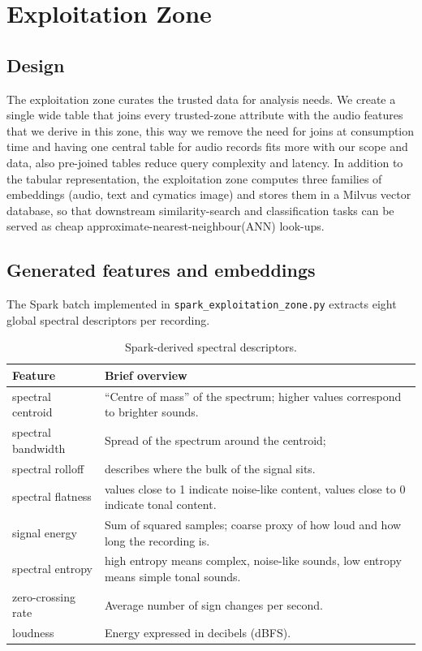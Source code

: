\documentclass[11pt,a4paper]{article}
\begin{document}
\section{Exploitation Zone}

\subsection{Design}
The exploitation zone curates the trusted data for analysis needs. We create a single wide table that joins every trusted-zone attribute with the audio features that we derive in this zone, this way we remove the need for joins at consumption time and having one central table for audio records fits more with our scope and data, also pre-joined tables reduce query complexity and latency. In addition to the tabular representation, the exploitation zone computes three families of embeddings (audio, text and cymatics image) and stores them in a Milvus vector database, so that downstream similarity-search and classification tasks can be served as cheap approximate-nearest-neighbour(ANN) look-ups.

\subsection{Generated features and embeddings}
The Spark batch implemented in \texttt{spark\_exploitation\_zone.py} extracts eight global spectral descriptors per recording.

\begin{table}[H]
\centering
\footnotesize
\renewcommand{\arraystretch}{1.15}
\begin{tabularx}{\textwidth}{@{}p{3.7cm}X@{}}
\toprule
\textbf{Feature} & \textbf{Brief overview}\\
\midrule
spectral centroid    & ``Centre of mass'' of the spectrum; higher values correspond to brighter sounds.\\
spectral bandwidth   & Spread of the spectrum around the centroid; \\
spectral rolloff     & describes where the bulk of the signal sits.\\
spectral flatness    & values close to 1 indicate noise-like content, values close to 0 indicate tonal content.\\
signal energy        & Sum of squared samples; coarse proxy of how loud and how long the recording is.\\
spectral entropy     & high entropy means complex, noise-like sounds, low entropy means simple tonal sounds.\\
zero-crossing rate   & Average number of sign changes per second.\\
loudness             & Energy expressed in decibels (dBFS).\\
\bottomrule
\end{tabularx}
\caption{Spark-derived spectral descriptors.}
\label{tab:spark-features}
\end{table}
\end{document}
